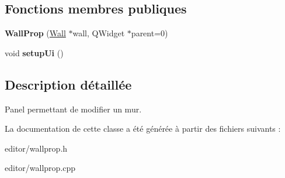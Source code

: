 \subsection*{Fonctions membres publiques}
\begin{DoxyCompactItemize}
\item 
\hypertarget{classWallProp_adb6bbb2ab2fbbb9a8e15a3f38b421595}{{\bfseries Wall\+Prop} (\hyperlink{classWall}{Wall} $\ast$wall, Q\+Widget $\ast$parent=0)}\label{classWallProp_adb6bbb2ab2fbbb9a8e15a3f38b421595}

\item 
\hypertarget{classWallProp_ad6a83260d08c321f8283d29505504c7f}{void {\bfseries setup\+Ui} ()}\label{classWallProp_ad6a83260d08c321f8283d29505504c7f}

\end{DoxyCompactItemize}


\subsection{Description détaillée}
Panel permettant de modifier un mur. 

La documentation de cette classe a été générée à partir des fichiers suivants \+:\begin{DoxyCompactItemize}
\item 
editor/wallprop.\+h\item 
editor/wallprop.\+cpp\end{DoxyCompactItemize}
